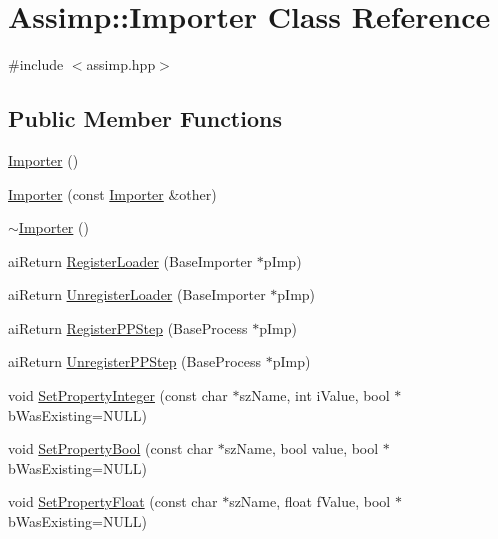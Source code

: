 \hypertarget{class_assimp_1_1_importer}{\section{Assimp\-:\-:Importer Class Reference}
\label{class_assimp_1_1_importer}
}


{\ttfamily \#include $<$assimp.\-hpp$>$}

\subsection*{Public Member Functions}
\begin{DoxyCompactItemize}
\item 
\hyperlink{class_assimp_1_1_importer_a2c207299ed05f1db1ad1e6dab005f719}{Importer} ()
\item 
\hyperlink{class_assimp_1_1_importer_a69743664b5a7a8c195be48265144317b}{Importer} (const \hyperlink{class_assimp_1_1_importer}{Importer} \&other)
\item 
\hyperlink{class_assimp_1_1_importer_a3d65af5286ba22f46220a72a6eb2a1c9}{$\sim$\-Importer} ()
\item 
ai\-Return \hyperlink{class_assimp_1_1_importer_a3846294ffe76d91a1d3096d22d7c6b7d}{Register\-Loader} (Base\-Importer $\ast$p\-Imp)
\item 
ai\-Return \hyperlink{class_assimp_1_1_importer_a3b1f5af2c763b13aca0f324b19001722}{Unregister\-Loader} (Base\-Importer $\ast$p\-Imp)
\item 
ai\-Return \hyperlink{class_assimp_1_1_importer_a102650d3648c0e414a1e73bdad9bed35}{Register\-P\-P\-Step} (Base\-Process $\ast$p\-Imp)
\item 
ai\-Return \hyperlink{class_assimp_1_1_importer_a3a683671c7c40638b1103c5d3648d86c}{Unregister\-P\-P\-Step} (Base\-Process $\ast$p\-Imp)
\item 
void \hyperlink{class_assimp_1_1_importer_aa50eba6120a9b9805d0c2b02f1187165}{Set\-Property\-Integer} (const char $\ast$sz\-Name, int i\-Value, bool $\ast$b\-Was\-Existing=N\-U\-L\-L)
\item 
void \hyperlink{class_assimp_1_1_importer_acf161a9fdd0d2ed3902e325351311389}{Set\-Property\-Bool} (const char $\ast$sz\-Name, bool value, bool $\ast$b\-Was\-Existing=N\-U\-L\-L)
\item 
void \hyperlink{class_assimp_1_1_importer_ab264807393b68662d1672c2b05e1c0cd}{Set\-Property\-Float} (const char $\ast$sz\-Name, float f\-Value, bool $\ast$b\-Was\-Existing=N\-U\-L\-L)
\item 

\end{DoxyCompactItemize}
